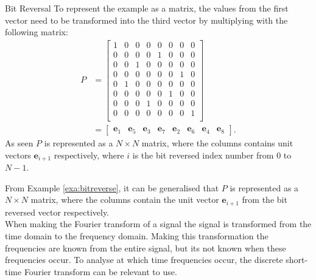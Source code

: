 \begin{example}{Bit Reversal}
    To represent the example as a matrix, the values from the first vector need to be transformed into the third vector by multiplying with the following matrix:
    \begin{align*}
        P&=
        \begin{bmatrix}
            1 & 0 & 0 & 0 & 0 & 0 & 0 & 0\\
            0 & 0 & 0 & 0 & 1 & 0 & 0 & 0\\
            0 & 0 & 1 & 0 & 0 & 0 & 0 & 0\\
            0 & 0 & 0 & 0 & 0 & 0 & 1 & 0\\
            0 & 1 & 0 & 0 & 0 & 0 & 0 & 0\\
            0 & 0 & 0 & 0 & 0 & 1 & 0 & 0\\
            0 & 0 & 0 & 1 & 0 & 0 & 0 & 0\\
            0 & 0 & 0 & 0 & 0 & 0 & 0 & 1\\
        \end{bmatrix}\\
        &=\begin{bmatrix}
        \mathbf{e}_1 & \mathbf{e}_5 & \mathbf{e}_3 & \mathbf{e}_7 & \mathbf{e}_2 & \mathbf{e}_6 & \mathbf{e}_4 & \mathbf{e}_8
        \end{bmatrix}.
 \end{align*}
   As seen $P$ is represented as a $N \times N$ matrix, where the columns contains unit vectors $\mathbf{e}_{i+1}$ respectively, where $i$ is the bit reversed index number from $0$ to $N-1$.
    \label{exa:bitreverse}
\end{example}
From Example \ref{exa:bitreverse}, it can be generalised that $P$ is represented as a $N \times N$ matrix, where the columns contain the unit vector $\mathbf{e}_{i+1}$ from the bit reversed vector respectively. \\

When making the Fourier transform of a signal the signal is transformed from the time domain to the frequency domain. Making this transformation the frequencies are known from the entire signal, but its not known when these frequencies occur. To analyse at which time frequencies occur, the discrete short-time Fourier transform can be relevant to use. 

